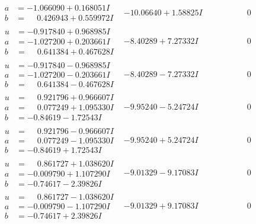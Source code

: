 \documentclass[1p]{elsarticle_modified}
\theoremstyle{definition}
\begin{document}
$$\begin{array}{c|c|c}
\begin{aligned}
a &= -1.066090 + 0.168051 I \\
b &= \phantom{-}0.426943 + 0.559972 I\end{aligned}
 & -10.06640 + 1.58825 I & \phantom{-0.000000 } 0 \\ \hline\begin{aligned}
u &= -0.917840 + 0.968985 I \\
a &= -1.027200 + 0.203661 I \\
b &= \phantom{-}0.641384 + 0.467628 I\end{aligned}
 & -8.40289 + 7.27332 I & \phantom{-0.000000 } 0 \\ \hline\begin{aligned}
u &= -0.917840 - 0.968985 I \\
a &= -1.027200 - 0.203661 I \\
b &= \phantom{-}0.641384 - 0.467628 I\end{aligned}
 & -8.40289 - 7.27332 I & \phantom{-0.000000 } 0 \\ \hline\begin{aligned}
u &= \phantom{-}0.921796 + 0.966607 I \\
a &= \phantom{-}0.077249 + 1.095330 I \\
b &= -0.84619 - 1.72543 I\end{aligned}
 & -9.95240 - 5.24724 I & \phantom{-0.000000 } 0 \\ \hline\begin{aligned}
u &= \phantom{-}0.921796 - 0.966607 I \\
a &= \phantom{-}0.077249 - 1.095330 I \\
b &= -0.84619 + 1.72543 I\end{aligned}
 & -9.95240 + 5.24724 I & \phantom{-0.000000 } 0 \\ \hline\begin{aligned}
u &= \phantom{-}0.861727 + 1.038620 I \\
a &= -0.009790 + 1.107290 I \\
b &= -0.74617 - 2.39826 I\end{aligned}
 & -9.01329 - 9.17083 I & \phantom{-0.000000 } 0 \\ \hline\begin{aligned}
u &= \phantom{-}0.861727 - 1.038620 I \\
a &= -0.009790 - 1.107290 I \\
b &= -0.74617 + 2.39826 I\end{aligned}
 & -9.01329 + 9.17083 I & \phantom{-0.000000 } 0 \\ \hline\begin{aligned}

\end{aligned}
\end{array}$$
\end{document}
